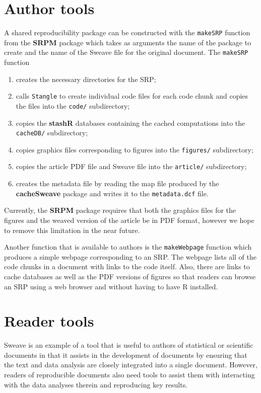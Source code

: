 \documentclass{article}
\newcommand{\code}{\texttt}
\newcommand{\pkg}{\textbf}
\begin{document}
\section{Author tools}

A shared reproducibility package can be constructed with the
\code{makeSRP} function from the \pkg{SRPM} package which takes as
arguments the name of the package to create and the name of the Sweave
file for the original document.  The \code{makeSRP} function
\begin{enumerate}
\item
creates the necessary directories for the SRP;
\item
calls \code{Stangle} to create individual code files for each code
chunk and copies the files into the \code{code/} subdirectory;
\item
copies the \pkg{stashR} databases containing the cached computations
into the \code{cacheDB/} subdirectory;
\item
copies graphics files corresponding to figures into the
\code{figures/} subdirectory;
\item
copies the article PDF file and Sweave file into the \code{article/}
subdirectory;
\item
creates the metadata file by reading the map file produced by the
\pkg{cacheSweave} package and writes it to the \code{metadata.dcf}
file.
\end{enumerate}
Currently, the \pkg{SRPM} package requires that both the graphics
files for the figures and the weaved version of the article be in PDF
format, however we hope to remove this limitation in the near future.

Another function that is available to authors is the
\code{makeWebpage} function which produces a simple webpage
corresponding to an SRP.  The webpage lists all of the code chunks in
a document with links to the code itself.  Also, there are links to
cache databases as well as the PDF versions of figures so that readers
can browse an SRP using a web browser and without having to have R
installed.






\section{Reader tools}

Sweave is an example of a tool that is useful to authors of
statistical or scientific documents in that it assists in the
development of documents by ensuring that the text and data analysis
are closely integrated into a single document.  However, readers of
reproducible documents also need tools to assist them with interacting
with the data analyses therein and reproducing key results.
\end{document}
